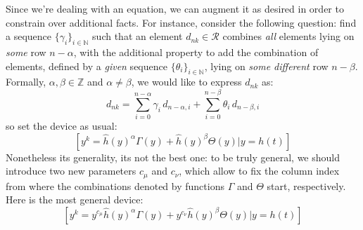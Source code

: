 Since we're dealing with an equation, we can augment it as desired in order to
constrain over additional facts. For instance, consider the following question:
find a sequence $\lbrace \gamma_{i} \rbrace_{i\in\mathbb{N}}$ such that 
an element $d_{nk}\in\mathcal{R}$ combines \emph{all} elements lying on 
\emph{some} row $n-\alpha$, with the additional property to add the combination of 
elements, defined by a \emph{given} sequence $\lbrace \theta_{i} \rbrace_{i\in\mathbb{N}}$, 
lying on \emph{some different} row $n-\beta$. Formally, $\alpha,\beta\in\mathbb{Z}$ 
and $\alpha \not=\beta$, we would like to express $d_{nk}$ as:
\begin{displaymath}
    d_{nk} = \sum_{i=0}^{n-\alpha}{\gamma_{i}\,d_{n-\alpha,i}} + 
        \sum_{i=0}^{n-\beta}{\theta_{i}\,d_{n-\beta,i}}
\end{displaymath}
so set the device as usual:
\begin{displaymath}
    \left[y^{k} = \hat{h}(y)^{\alpha} \Gamma(y) + \hat{h}(y)^{\beta} \Theta(y) \big| y = h(t) \right]
\end{displaymath}
Nonetheless its generality, its not the best one: to be truly general,
we should introduce two new parameters $c_\mu$ and $c_\nu$, which allow
to fix the column index from where the combinations denoted by functions
$\Gamma$ and $\Theta$ start, respectively. Here is the most general device:
\begin{displaymath}
    \left[y^{k} = y^{c_\mu}\hat{h}(y)^{\alpha} \Gamma(y) + 
        y^{c_\nu}\hat{h}(y)^{\beta} \Theta(y) \big| y = h(t) \right]
\end{displaymath}
\\
